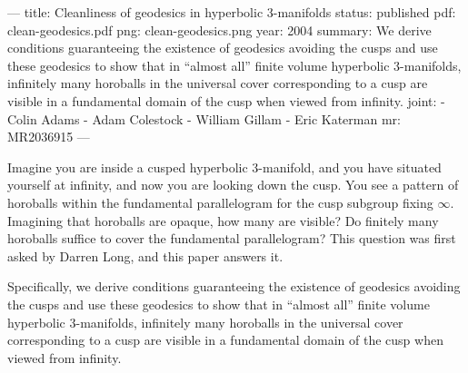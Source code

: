 ---
title: Cleanliness of geodesics in hyperbolic 3-manifolds
status: published
pdf: clean-geodesics.pdf
png: clean-geodesics.png
year: 2004
summary: We derive conditions guaranteeing the existence of geodesics avoiding the cusps and use these geodesics to show that in ``almost all'' finite volume hyperbolic 3-manifolds, infinitely many horoballs in the universal cover corresponding to a cusp are visible in a fundamental domain of the cusp when viewed from infinity.
joint:
  - Colin Adams
  - Adam Colestock
  - William Gillam
  - Eric Katerman
mr: MR2036915
---

Imagine you are inside a cusped hyperbolic 3-manifold, and you have situated yourself at infinity, and now you are looking down the cusp.  You see a pattern of horoballs within the fundamental parallelogram for the cusp subgroup fixing $\infty$.  Imagining that horoballs are opaque, how many are visible?  Do finitely many horoballs suffice to cover the fundamental parallelogram?  This question was first asked by Darren Long, and this paper answers it.

Specifically, we derive conditions guaranteeing the existence of geodesics avoiding the cusps and use these geodesics to show that in ``almost all'' finite volume hyperbolic 3-manifolds, infinitely many horoballs in the universal cover corresponding to a cusp are visible in a fundamental domain of the cusp when viewed from infinity.
